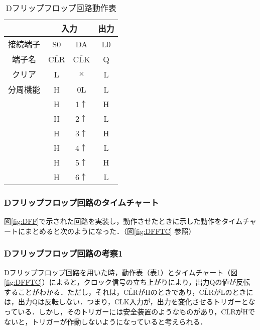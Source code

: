 \begin {table}[ht]
	\begin {center}
		\caption {Dフリップフロップ回路動作表}%
		\begin {tabular}{c|cc|c}\hline
			\multicolumn{1}{c|}{}&%
			\multicolumn{2}{c}{入力}&%
			\multicolumn{1}{|c}{出力}\\ %
			\hline
			接続端子	&	S0				&	DA				&	L0	\\
			端子名	&	$\overline{\mathrm{CLR}}$	&	$\overline{\mathrm{CLK}}$	&	Q	\\ \hline
			クリア	&	L				&	$\times$			&	L	\\ \hline
			分周機能	&	H				&	0L				&	L	\\
					&	H				&	$1\uparrow$		&	H	\\
					&	H				&	$2\uparrow$		&	L	\\
					&	H				&	$3\uparrow$		&	H	\\
					&	H				&	$4\uparrow$		&	L	\\
					&	H				&	$5\uparrow$		&	H	\\
					&	H				&	$6\uparrow$		&	L	\\
		\hline
		\end{tabular}
		\label {tab:DFF_dousahyoutab}%
	\end{center}
\end{table}



%
%
\subsubsection{Dフリップフロップ回路のタイムチャート}
\label{DFF_timechart}
図\ref{fig:DFF}で示された回路を実装し，動作させたときに示した動作をタイムチャートにまとめると次のようになった．（図\ref{fig:DFFTC} 参照）

%
%
\subsubsection{Dフリップフロップ回路の考察1}
\label{DFF_consideration1}
Dフリップフロップ回路を用いた時，動作表（表\ref{tab:DFF_dousahyoutab}）とタイムチャート（図\ref{fig:DFFTC}）によると，クロック信号の立ち上がりにより，出力Qの値が反転することがわかる．ただし，それは，$\overline{\mathrm{CLR}}$がHのときであり，$\overline{\mathrm{CLR}}$がLのときには，出力Qは反転しない．つまり，CLK入力が，出力を変化させるトリガーとなっている．しかし，そのトリガーには安全装置のようなものがあり，$\overline{\mathrm{CLR}}$がHでないと，トリガーが作動しないようになっていると考えられる．

